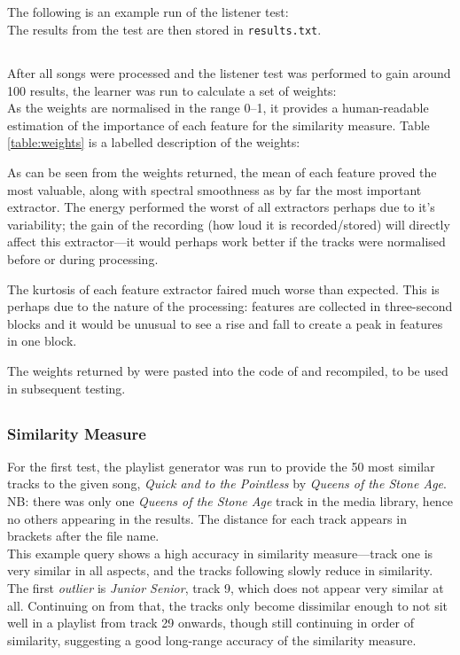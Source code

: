 \subsection{}
The following is an example run of the listener test:\\

The results from the test are then stored in \texttt{results.txt}.
\subsection{}
After all songs were processed and the listener test was performed to gain around 100 results, the learner was run to calculate a set of weights:\\

As the weights are normalised in the range 0--1, it provides a human-readable estimation of the importance of each feature for the similarity measure. Table \ref{table:weights} is a labelled description of the weights:


As can be seen from the weights returned, the mean of each feature proved the most valuable, along with spectral smoothness as by far the most important extractor. The energy performed the worst of all extractors perhaps due to it's variability; the gain of the recording (how loud it is recorded/stored) will directly affect this extractor---it would perhaps work better if the tracks were normalised before or during processing.

The kurtosis of each feature extractor faired much worse than expected. This is perhaps due to the nature of the processing: features are collected in three-second blocks and it would be unusual to see a rise and fall to create a peak in features in one block.

The weights returned by  were pasted into the code of  and recompiled, to be used in subsequent testing.
\pagebreak
\subsection{}
\subsubsection{Similarity Measure}
For the first test, the playlist generator was run to provide the 50 most similar tracks to the given song, \emph{Quick and to the Pointless} by \emph{Queens of the Stone Age}. NB: there was only one \emph{Queens of the Stone Age} track in the media library, hence no others appearing in the results. The distance for each track appears in brackets after the file name.\\

This example query shows a high accuracy in similarity measure---track one is very similar in all aspects, and the tracks following slowly reduce in similarity. The first \emph{outlier} is \emph{Junior Senior}, track 9, which does not appear very similar at all. Continuing on from that, the tracks only become dissimilar enough to not sit well in a playlist from track 29 onwards, though still continuing in order of similarity, suggesting a good long-range accuracy of the similarity measure. 
